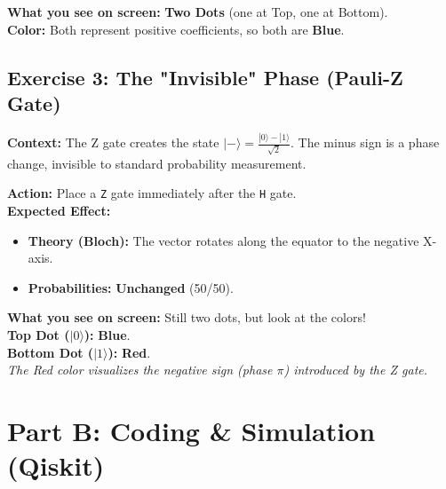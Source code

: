 \documentclass[a4paper,11pt]{article}
\begin{document}
\begin{composerbox}
\textbf{What you see on screen:} \textbf{Two Dots} (one at Top, one at Bottom).
\\
\textbf{Color:} Both represent positive coefficients, so both are \textcolor{ibmblue}{\textbf{Blue}}.
\end{composerbox}

\subsection{Exercise 3: The "Invisible" Phase (Pauli-Z Gate)}
\textbf{Context:} The Z gate creates the state $|-\rangle = \frac{|0\rangle - |1\rangle}{\sqrt{2}}$. The minus sign is a phase change, invisible to standard probability measurement.

\begin{studentbox}
\textbf{Action:} Place a \texttt{Z} gate immediately after the \texttt{H} gate.
\\
\textbf{Expected Effect:}
\begin{itemize}
    \item \textbf{Theory (Bloch):} The vector rotates along the equator to the negative X-axis.
    \item \textbf{Probabilities:} \textbf{Unchanged} (50/50).
\end{itemize}
\end{studentbox}

\begin{composerbox}
\textbf{What you see on screen:} Still two dots, but look at the colors!
\\
\textbf{Top Dot ($|0\rangle$):} \textcolor{ibmblue}{\textbf{Blue}}.
\\
\textbf{Bottom Dot ($|1\rangle$):} \textcolor{ibmred}{\textbf{Red}}.
\\
\textit{The Red color visualizes the negative sign (phase $\pi$) introduced by the Z gate.}
\end{composerbox}

\newpage

\section{Part B: Coding \& Simulation (Qiskit)}
\end{document}
